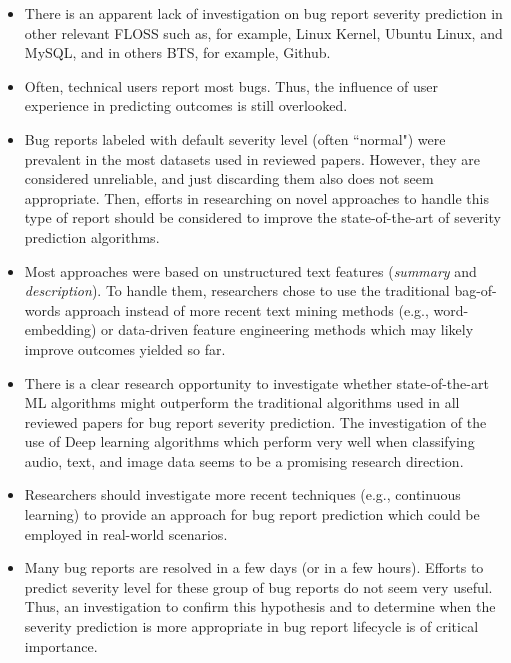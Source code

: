 \begin{itemize}
  \item There is an apparent lack of investigation on bug report severity prediction in other relevant FLOSS such as, for example, Linux Kernel, Ubuntu Linux, and MySQL, and in others BTS, for example, Github.
  \item Often, technical users report most bugs. Thus, the influence of user experience in predicting outcomes is still overlooked.  
  \item Bug reports labeled with default severity level (often ``normal") were prevalent in the most datasets used in reviewed papers. However, they are considered unreliable\cite{Saha:2015}, and just discarding them also does not seem appropriate. Then, efforts in researching on novel approaches to handle this type of report should be considered to improve the state-of-the-art of severity prediction algorithms.
  \item Most approaches were based on unstructured text features (\textit{summary} and \textit{description}). To handle them, researchers chose to use the traditional bag-of-words approach instead of more recent text mining methods (e.g., word-embedding\cite{Guoyin:2018}) or data-driven feature engineering methods which may likely improve outcomes yielded so far.
  \item There is a clear research opportunity to investigate whether state-of-the-art ML algorithms might outperform the traditional algorithms used in all reviewed papers for bug report severity prediction. The investigation of the use of Deep learning algorithms which perform very well when classifying audio, text, and image data\cite{Goodfellow:2016} seems to be a promising research direction.
  \item Researchers should investigate more recent techniques (e.g., continuous learning\cite{Chen:2016}) to provide an approach for bug report prediction which could be employed in real-world scenarios.
  \item Many bug reports are resolved in a few days (or in a few hours)\cite{Saha:2015b}. Efforts to predict severity level for these group of bug reports do not seem very useful. Thus, an investigation to confirm this hypothesis and to determine when the severity prediction is more appropriate in bug report lifecycle is of critical importance.
\end{itemize}

